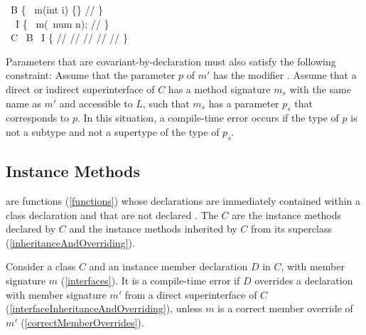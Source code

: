 \documentclass[makeidx]{article}
\begin{document}
\begin{dartCode}
\CLASS\ B \{
  \VOID\ m(int i) \{\} // 
\}
\\
\ABSTRACT\ \CLASS\ I \{
  \VOID\ m(\COVARIANT\ num n); // 
\}
\\
\CLASS\ C \EXTENDS\ B \IMPLEMENTS\ I \{
  // 
  //
  // 
  // 
  // 
\}
\end{dartCode}

\LMHash{}%
Parameters that are covariant-by-declaration
must also satisfy the following constraint:
Assume that the parameter $p$ of $m'$ has the modifier \COVARIANT.
Assume that a direct or indirect superinterface of $C$ has
a method signature $m_s$ with the same name as $m'$ and accessible to $L$,
such that $m_s$ has a parameter $p_s$ that corresponds to $p$.
In this situation, a compile-time error occurs
if the type of $p$ is not a subtype and not a supertype of the type of $p_s$.



\subsection{Instance Methods}

\LMHash{}%
are functions (\ref{functions})
whose declarations are immediately contained within a class declaration
and that are not declared \STATIC.
The  $C$ are
the instance methods declared by $C$
and the instance methods inherited by $C$ from its superclass
(\ref{inheritanceAndOverriding}).

\LMHash{}%
%
Consider a class $C$
and an instance member declaration $D$ in $C$, with member signature $m$
(\ref{interfaces}).
It is a compile-time error if $D$ overrides a declaration
with member signature $m'$
from a direct superinterface of $C$
(\ref{interfaceInheritanceAndOverriding}),
unless $m$ is a correct member override of $m'$
(\ref{correctMemberOverrides}).
\end{document}
